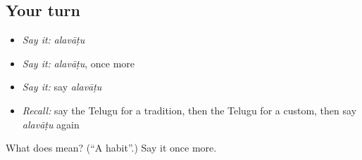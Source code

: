 \subsection*{Your turn}
\begin{itemize}
\raggedright
  \item \emph{Say it:} \emph{alavāṭu}
  \item \emph{Say it:} \emph{alavāṭu}, once more
  \item \emph{Say it:} say \emph{alavāṭu}
  \item \emph{Recall:} say the Telugu for a tradition, then the Telugu for a custom, then say \emph{alavāṭu} again
\end{itemize}

\begin{tcolorbox}[breakable,colback=teal!4,colframe=teal!35!black,title={Before you move on}]
What does  mean? (\textquotedblleft{}A habit\textquotedblright{}.) Say it once more.
\end{tcolorbox}
